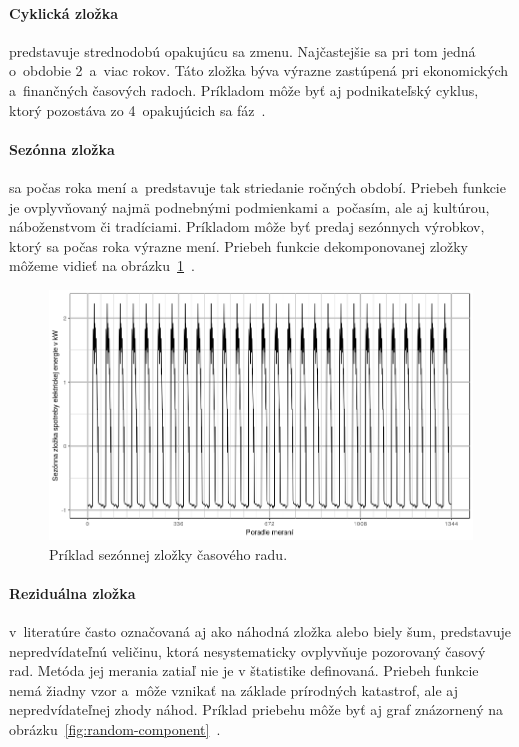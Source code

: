 \documentclass[a4paper,twoside,slovak,12pt,appendix]{article}
\begin{document}
\paragraph{Cyklická zložka} predstavuje strednodobú opakujúcu sa zmenu.
Najčastejšie sa pri tom jedná o~obdobie 2~a~viac rokov. Táto zložka býva výrazne
zastúpená pri ekonomických a~finančných časových radoch. Príkladom môže byť
aj podnikateľský cyklus, ktorý pozostáva zo 4~opakujúcich sa
fáz~\cite{Agrawal2013}.

\paragraph{Sezónna zložka} sa počas roka mení a~predstavuje tak striedanie
ročných období. Priebeh funkcie je ovplyvňovaný najmä podnebnými podmienkami
a~počasím, ale aj kultúrou, náboženstvom či tradíciami. Príkladom môže byť
predaj sezónnych výrobkov, ktorý sa počas roka výrazne mení. Priebeh funkcie
dekomponovanej zložky môžeme vidieť na
obrázku~\ref{fig:seasonal-component}~\cite{Agrawal2013}.

\begin{figure}[H]
  \centering
  \includegraphics[width=\textwidth]{season_component.png}
  \caption{Príklad sezónnej zložky časového radu.}
  \label{fig:seasonal-component}
\end{figure}

\paragraph{Reziduálna zložka} v~literatúre často označovaná aj ako náhodná
zložka alebo biely šum, predstavuje nepredvídateľnú veličinu, ktorá
nesystematicky ovplyvňuje pozorovaný časový rad. Metóda jej merania zatiaľ nie
je v štatistike definovaná. Priebeh funkcie nemá žiadny vzor a~môže vznikať na
základe prírodných katastrof, ale aj nepredvídateľnej zhody náhod. Príklad
priebehu môže byť aj graf znázornený na
obrázku~\ref{fig:random-component}~\cite{Agrawal2013}.
\end{document}

